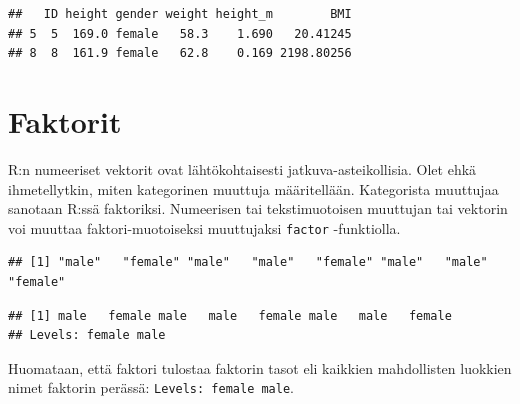 \documentclass[
]{book}
\newenvironment{Shaded}{\begin{snugshade}}{\end{snugshade}}
\newcommand{\CommentTok}[1]{\textcolor[rgb]{0.56,0.35,0.01}{\textit{#1}}}
\newcommand{\FunctionTok}[1]{\textcolor[rgb]{0.00,0.00,0.00}{#1}}
\newcommand{\NormalTok}[1]{#1}
\newcommand{\OtherTok}[1]{\textcolor[rgb]{0.56,0.35,0.01}{#1}}
\newcommand{\SpecialCharTok}[1]{\textcolor[rgb]{0.00,0.00,0.00}{#1}}
\begin{document}
\begin{verbatim}
##   ID height gender weight height_m        BMI
## 5  5  169.0 female   58.3    1.690   20.41245
## 8  8  161.9 female   62.8    0.169 2198.80256
\end{verbatim}

\hypertarget{faktorit}{%
\section{Faktorit}\label{faktorit}}

R:n numeeriset vektorit ovat lähtökohtaisesti jatkuva-asteikollisia. Olet ehkä ihmetellytkin, miten kategorinen muuttuja määritellään. Kategorista muuttujaa sanotaan R:ssä faktoriksi. Numeerisen tai tekstimuotoisen muuttujan tai vektorin voi muuttaa faktori-muotoiseksi muuttujaksi \texttt{factor} -funktiolla.

\begin{Shaded}
\end{Shaded}

\begin{verbatim}
## [1] "male"   "female" "male"   "male"   "female" "male"   "male"   "female"
\end{verbatim}

\begin{Shaded}
\end{Shaded}

\begin{verbatim}
## [1] male   female male   male   female male   male   female
## Levels: female male
\end{verbatim}

Huomataan, että faktori tulostaa faktorin tasot eli kaikkien mahdollisten luokkien nimet faktorin perässä: \texttt{Levels:\ female\ male}.
\end{document}
